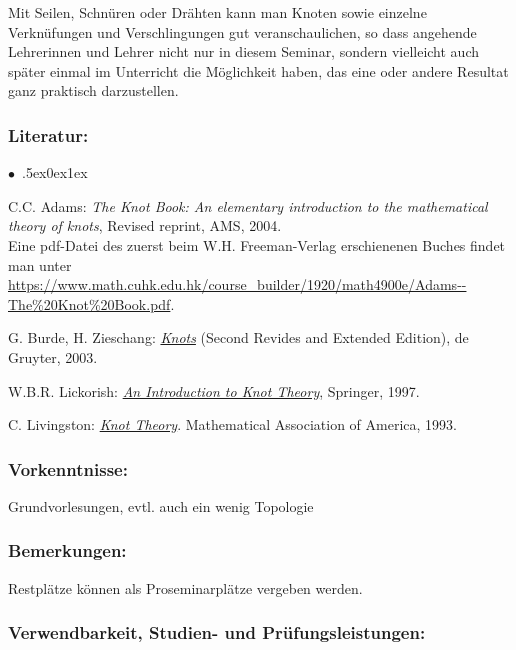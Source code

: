 \documentclass[a4paper,10pt]{article}
\renewenvironment{itemize}{\begin{list}{$\bullet$\ }{\itemsep.5ex\setlength{\topsep}{0.5\itemsep}\parsep0ex\labelsep1ex\settowidth{\labelwidth}{$\bullet$\ }\setlength{\leftmargin}{\labelwidth}\addtolength{\leftmargin}{3ex}\addtolength{\leftmargin}{\labelsep}}}{\end{list}}
\begin{document}
Mit Seilen, Schnüren oder Drähten kann man Knoten sowie einzelne Verknüfungen und Verschlingungen gut veranschaulichen, so dass angehende Lehrerinnen und Lehrer nicht nur in diesem Seminar, sondern vielleicht auch später einmal im Unterricht die Möglichkeit haben, das eine oder andere Resultat ganz praktisch darzustellen.
\subsubsection*{\large
    Literatur:
}
\begin{itemize} 
\item C.C. Adams: \textit{The Knot Book: An elementary introduction to the mathematical theory of knots}, Revised reprint, AMS, 2004.\\
Eine pdf-Datei des zuerst beim W.H. Freeman-Verlag erschienenen Buches findet man unter \url{https://www.math.cuhk.edu.hk/course\_builder/1920/math4900e/Adams--The\%20Knot\%20Book.pdf}.            
\item G. Burde, H. Zieschang: \href{https://www.maths.ed.ac.uk/~v1ranick/papers/burdzies.pdf}{\textit{Knots}} (Second Revides and Extended Edition), de Gruyter, 2003.
\item W.B.R. Lickorish: \href{http://www.redi-bw.de/start/unifr/EBooks-springer/10.1007/978-1-4612-0691-0}{\textit{An Introduction to Knot Theory}}, Springer, 1997.
\item C. Livingston: \href{https://www.math.cuhk.edu.hk/course\_builder/1920/math4900e/Livingston\%20C.---Knot\%20theory\%20(MAA,\%201996).pdf}{\textit{Knot Theory}}. Mathematical Association of America, 1993.
\end{itemize}
\subsubsection*{\large
    Vorkenntnisse:
}
Grundvorlesungen, evtl. auch ein wenig Topologie
\subsubsection*{\large
    Bemerkungen:
}
Restplätze können als Proseminarplätze vergeben werden.
\subsubsection*{\large
    Verwendbarkeit, Studien- und Prüfungsleistungen:
}
\end{document}
